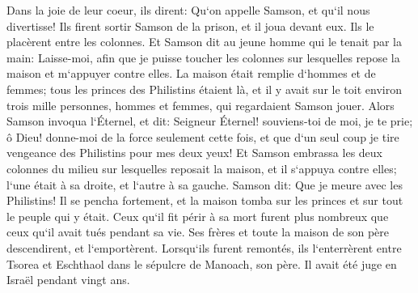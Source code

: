 \verse Dans la joie de leur coeur, ils dirent: Qu`on appelle Samson, et qu`il nous divertisse! Ils firent sortir Samson de la prison, et il joua devant eux. Ils le placèrent entre les colonnes. 
\verse Et Samson dit au jeune homme qui le tenait par la main: Laisse-moi, afin que je puisse toucher les colonnes sur lesquelles repose la maison et m`appuyer contre elles. 
\verse La maison était remplie d`hommes et de femmes; tous les princes des Philistins étaient là, et il y avait sur le toit environ trois mille personnes, hommes et femmes, qui regardaient Samson jouer. 
\verse Alors Samson invoqua l`Éternel, et dit: Seigneur Éternel! souviens-toi de moi, je te prie; ô Dieu! donne-moi de la force seulement cette fois, et que d`un seul coup je tire vengeance des Philistins pour mes deux yeux! 
\verse Et Samson embrassa les deux colonnes du milieu sur lesquelles reposait la maison, et il s`appuya contre elles; l`une était à sa droite, et l`autre à sa gauche. 
\verse Samson dit: Que je meure avec les Philistins! Il se pencha fortement, et la maison tomba sur les princes et sur tout le peuple qui y était. Ceux qu`il fit périr à sa mort furent plus nombreux que ceux qu`il avait tués pendant sa vie. 
\verse Ses frères et toute la maison de son père descendirent, et l`emportèrent. Lorsqu`ils furent remontés, ils l`enterrèrent entre Tsorea et Eschthaol dans le sépulcre de Manoach, son père. Il avait été juge en Israël pendant vingt ans. 

